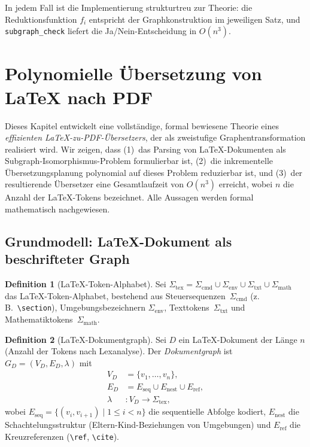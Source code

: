 ﻿\documentclass[a4paper,12pt]{article}
\theoremstyle{definition}
\newtheorem{definition}{Definition}
\begin{document}
In jedem Fall ist die Implementierung strukturtreu zur Theorie: die
Reduktionsfunktion $f_i$ entspricht der Graphkonstruktion im
jeweiligen Satz, und \texttt{subgraph\_check} liefert die Ja/Nein-Entscheidung
in $O(n^3)$.


\section{Polynomielle Übersetzung von \LaTeX{} nach PDF}
\label{sec:latexuebersetzer}

Dieses Kapitel entwickelt eine vollständige, formal bewiesene Theorie eines
\emph{effizienten \LaTeX-zu-PDF-Übersetzers}, der als zweistufige
Graphentransformation realisiert wird. Wir zeigen, dass (1)~das Parsing von
\LaTeX-Dokumenten als Subgraph-Isomorphismus-Problem formulierbar ist,
(2)~die inkrementelle Übersetzungsplanung polynomial auf dieses Problem
reduzierbar ist, und (3)~der resultierende Übersetzer eine Gesamtlaufzeit
von $O(n^3)$ erreicht, wobei $n$ die Anzahl der \LaTeX-Tokens bezeichnet.
Alle Aussagen werden formal mathematisch nachgewiesen.

\subsection{Grundmodell: \LaTeX-Dokument als beschrifteter Graph}
\label{sec:ltx-grundmodell}

\begin{definition}[\LaTeX-Token-Alphabet]
	\label{def:ltx-alpha}
	Sei $\Sigma_{\mathrm{tex}} = \Sigma_{\mathrm{cmd}} \cup \Sigma_{\mathrm{env}}
	\cup \Sigma_{\mathrm{txt}} \cup \Sigma_{\mathrm{math}}$ das \LaTeX-Token-Alphabet,
	bestehend aus Steuersequenzen~$\Sigma_{\mathrm{cmd}}$
	(z.\,B.~\texttt{\textbackslash section}), Umgebungsbezeichnern
	$\Sigma_{\mathrm{env}}$, Texttokens~$\Sigma_{\mathrm{txt}}$ und
	Mathematiktokens~$\Sigma_{\mathrm{math}}$.
\end{definition}

\begin{definition}[\LaTeX-Dokumentgraph]
	\label{def:ltx-graph}
	Sei $D$ ein \LaTeX-Dokument der Länge $n$ (Anzahl der Tokens nach Lexanalyse).
	Der \emph{Dokumentgraph} ist $G_D = (V_D, E_D, \lambda)$ mit
	\begin{align*}
		V_D &= \{v_1, \ldots, v_n\},\\
		E_D &= E_{\mathrm{seq}} \cup E_{\mathrm{nest}} \cup E_{\mathrm{ref}},\\
		\lambda &: V_D \to \Sigma_{\mathrm{tex}},
	\end{align*}
	wobei $E_{\mathrm{seq}} = \{(v_i, v_{i+1}) \mid 1 \le i < n\}$ die
	sequentielle Abfolge kodiert, $E_{\mathrm{nest}}$ die Schachtelungsstruktur
	(Eltern-Kind-Beziehungen von Umgebungen) und $E_{\mathrm{ref}}$ die
	Kreuzreferenzen (\texttt{\textbackslash ref}, \texttt{\textbackslash cite}).
\end{definition}
\end{document}
